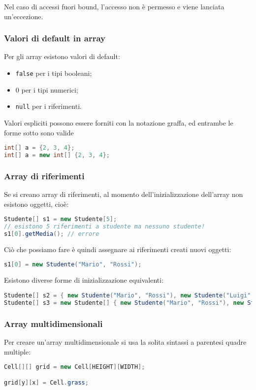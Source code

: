 \documentclass[a4paper,11pt]{article}
\begin{document}
Nel caso di accessi fuori bound, l'accesso non è permesso e viene lanciata un'eccezione.

\subsubsection{Valori di default in array}
Per gli array esistono valori di default:
\begin{itemize}
	\item \lstinline|false| per i tipi booleani;
	\item 0 per i tipi numerici;
	\item \lstinline|null| per i riferimenti.
\end{itemize}

Valori espliciti possono essere forniti con la notazione graffa, ed entrambe le forme sotto sono valide 
\begin{lstlisting}[language=java, style=codestyle]
int[] a = {2, 3, 4};
int[] a = new int[] {2, 3, 4};
\end{lstlisting}

\subsubsection{Array di riferimenti}
Se si creano array di riferimenti, al momento dell'inizializzazione dell'array non esistono oggetti, cioè:
\begin{lstlisting}[language=java, style=codestyle]	
Studente[] s1 = new Studente[5];
// esistono 5 riferimenti a studente ma nessuno studente!
s1[0].getMedia(); // errore 
\end{lstlisting}

Ciò che possiamo fare è quindi assegnare ai riferimenti creati nuovi oggetti:
\begin{lstlisting}[language=java, style=codestyle]	
s1[0] = new Studente("Mario", "Rossi");
\end{lstlisting}

Esistono diverse forme di inizializzazione equivalenti:
\begin{lstlisting}[language=java, style=codestyle]	
Studente[] s2 = { new Studente("Mario", "Rossi"), new Studente("Luigi", "Verdi") };
Studente[] s3 = new Studente[] { new Studente("Mario", "Rossi"), new Studente("Luigi", "Verdi") };
\end{lstlisting}

\subsubsection{Array multidimensionali}
Per creare un'array multidimensionale si usa la solita sintassi a parentesi quadre multiple:
\begin{lstlisting}[language=java, style=codestyle]	
Cell[][] grid = new Cell[HEIGHT][WIDTH];

grid[y][x] = Cell.grass;
\end{lstlisting}
\end{document}
